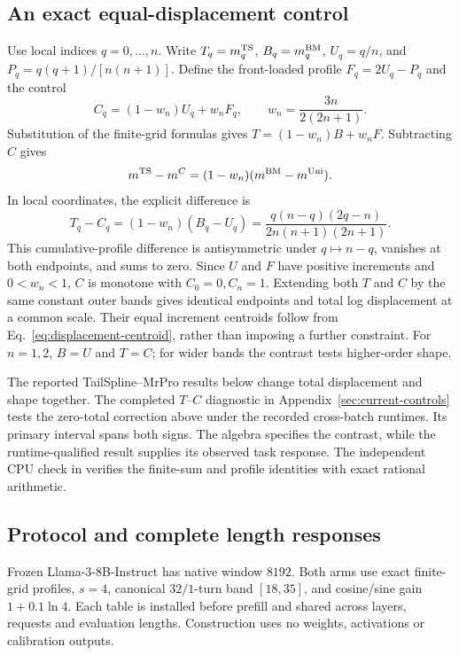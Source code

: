 \subsection{An exact equal-displacement control}
\label{sec:tailspline-dose-control}
Use local indices $q=0,\ldots,n$. Write $T_q=m_q^{\rm TS}$, $B_q=m_q^{\rm BM}$, $U_q=q/n$, and $P_q=q(q+1)/[n(n+1)]$. Define the front-loaded profile $F_q=2U_q-P_q$ and the control
\begin{equation}
C_q=(1-w_n)U_q+w_nF_q,\qquad w_n=\frac{3n}{2(2n+1)}.
\label{eq:tailspline-dose-control}
\end{equation}
Substitution of the finite-grid formulas gives $T=(1-w_n)B+w_nF$. Subtracting $C$ gives
\begin{equation}
m^{\rm TS}-m^C=(1-w_n)(m^{\rm BM}-m^{\rm Uni}).
\label{eq:tailspline-shape-contrast}
\end{equation}
In local coordinates, the explicit difference is
\begin{equation}
T_q-C_q=(1-w_n)(B_q-U_q)=\frac{q(n-q)(2q-n)}{2n(n+1)(2n+1)}.
\label{eq:tailspline-antisymmetric-contrast}
\end{equation}
This cumulative-profile difference is antisymmetric under $q\mapsto n-q$, vanishes at both endpoints, and sums to zero. Since $U$ and $F$ have positive increments and $0<w_n<1$, $C$ is monotone with $C_0=0,C_n=1$. Extending both $T$ and $C$ by the same constant outer bands gives identical endpoints and total log displacement at a common scale. Their equal increment centroids follow from Eq.~\eqref{eq:displacement-centroid}, rather than imposing a further constraint. For $n=1,2$, $B=U$ and $T=C$; for wider bands the contrast tests higher-order shape.

The reported TailSpline--MrPro results below change total displacement and shape together. The completed $T$--$C$ diagnostic in Appendix~\ref{sec:current-controls} tests the zero-total correction above under the recorded cross-batch runtimes. Its primary interval spans both signs. The algebra specifies the contrast, while the runtime-qualified result supplies its observed task response. The independent CPU check in  verifies the finite-sum and profile identities with exact rational arithmetic.

\subsection{Protocol and complete length responses}
Frozen Llama-$3$-$8$B-Instruct has native window $8192$. Both arms use exact finite-grid profiles, $s=4$, canonical $32/1$-turn band $[18,35]$, and cosine/sine gain $1+0.1\ln4$. Each table is installed before prefill and shared across layers, requests and evaluation lengths. Construction uses no weights, activations or calibration outputs.

